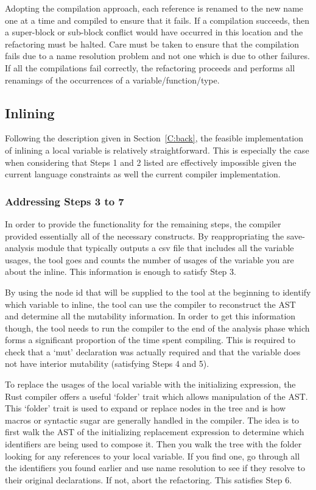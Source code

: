 Adopting the compilation approach, each reference is renamed to the new name one at a time and compiled to ensure that it fails. If a compilation succeeds, then a super-block or sub-block conflict would have occurred in this location and the refactoring must be halted. Care must be taken to ensure that the compilation fails due to a name resolution problem and not one which is due to other failures. If all the compilations fail correctly, the refactoring proceeds and performs all renamings of the occurrences of a variable/function/type.

\subsection{Inlining}

Following the description given in Section~\ref{C:back}, the feasible implementation of inlining a local variable is relatively straightforward. This is especially the case when considering that Steps 1 and 2 listed are effectively impossible given the current language constraints as well the current compiler implementation.

\subsubsection{Addressing Steps 3 to 7}
In order to provide the functionality for the remaining steps, the compiler provided essentially all of the necessary constructs. By reappropriating the save-analysis module that typically outputs a csv file that includes all the variable usages, the tool goes and counts the number of usages of the variable you are about the inline. This information is enough to satisfy Step 3.

By using the node id that will be supplied to the tool at the beginning to identify which variable to inline, the tool can use the compiler to reconstruct the AST and determine all the mutability information. In order to get this information though, the tool needs to run the compiler to the end of the analysis phase which forms a significant proportion of the time spent compiling. This is required to check that a `mut' declaration was actually required and that the variable does not have interior mutability (satisfying Steps 4 and 5).

To replace the usages of the local variable with the initializing expression, the Rust compiler offers a useful `folder' trait which allows manipulation of the AST. This `folder' trait is used to expand or replace nodes in the tree and is how macros or syntactic sugar are generally handled in the compiler. The idea is to first walk the AST of the initializing replacement expression to determine which identifiers are being used to compose it. Then you walk the tree with the folder looking for any references to your local variable. If you find one, go through all the identifiers you found earlier and use name resolution to see if they resolve to their original declarations. If not, abort the refactoring. This satisfies Step 6.

